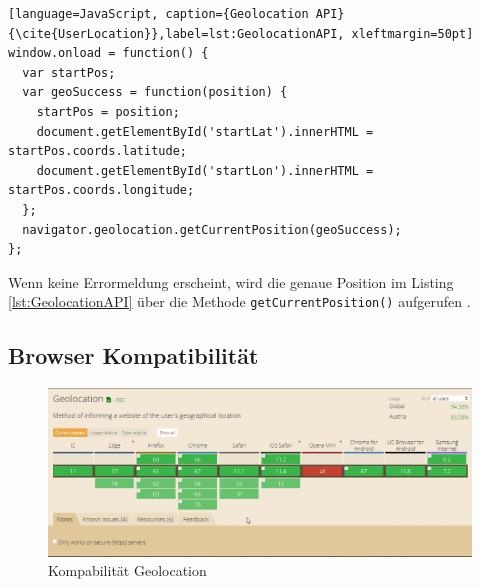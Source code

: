 \begin{lstlisting}[language=JavaScript, caption={Geolocation API} {\cite{UserLocation}},label=lst:GeolocationAPI, xleftmargin=50pt]
window.onload = function() {
  var startPos;
  var geoSuccess = function(position) {
    startPos = position;
    document.getElementById('startLat').innerHTML = startPos.coords.latitude;
    document.getElementById('startLon').innerHTML = startPos.coords.longitude;
  };
  navigator.geolocation.getCurrentPosition(geoSuccess);
};
\end{lstlisting}

Wenn keine Errormeldung erscheint, wird die genaue Position im Listing \ref{lst:GeolocationAPI} über die Methode \texttt{getCurrentPosition()}  aufgerufen \cite{UserLocation}.
\newpage
\subsection{Browser Kompatibilität}
\begin{figure}[h]
	\centering
	\includegraphics[width=14cm]{BilderAllgemein/BrowserGL}\medskip
	\caption{Kompabilität Geolocation \cite{BrowserSupport}}
	\label{fig:BrowserGL}
\end{figure}









